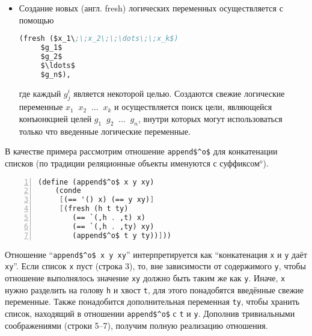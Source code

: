 \begin{itemize}
\item Создание новых (англ. fresh) логических переменных осуществляется с помощью

\begin{lstlisting}[language=scheme]
   (fresh ($x_1\;\;x_2\;\;\dots\;\;x_k$)
     $g_1$
     $g_2$
     $\ldots$
     $g_n$),
\end{lstlisting}

где каждый $g^i_j$ является некоторой целью. Создаются свежие логические переменные  $x_1\;\;x_2\;\;\dots\;\;x_k$ и
осуществляется поиск цели, являющейся конъюнкцией целей $g_1\;\;g_2\;\;\dots\;\;g_n$, внутри которых могут использоваться только что введенные логические переменные.
\end{itemize}

В качестве примера рассмотрим отношение  \lstinline|append$^o$| для конкатенации списков (по традиции реляционные объекты именуются с суффиксом$^o$).

\begin{lstlisting}[mathescape=true,language=scheme,numbers=left,numberstyle=\small,stepnumber=1,numbersep=-5pt]
  (define (append$^o$ x y xy)
    (conde
     [(== '() x) (== y xy)]
     [(fresh (h t ty)
        (== `(,h . ,t) x)
        (== `(,h . ,ty) xy)
        (append$^o$ t y ty))]))
\end{lstlisting}

Отношение \enquote{\lstinline|append$^o$ x y xy|} интерпретируется как \enquote{конкатенация  \lstinline|x| и \lstinline|y| даёт \lstinline|xy|}.
Если список \lstinline|x| пуст (строка 3), то, вне зависимости от содержимого \lstinline|y|, чтобы отношение выполнялось значение \lstinline|xy| должно быть таким же как \lstinline|y|.
Иначе, \lstinline|x| нужно разделить на голову \lstinline|h| и хвост \lstinline|t|, для этого понадобятся введённые свежие переменные.
Также понадобится дополнительная переменная \lstinline|ty|, чтобы хранить список, находящий в отношении \lstinline|append$^o$| с \lstinline|t| и \lstinline|y|.
Дополнив тривиальными соображениями (строки 5--7), получим полную реализацию отношения.



